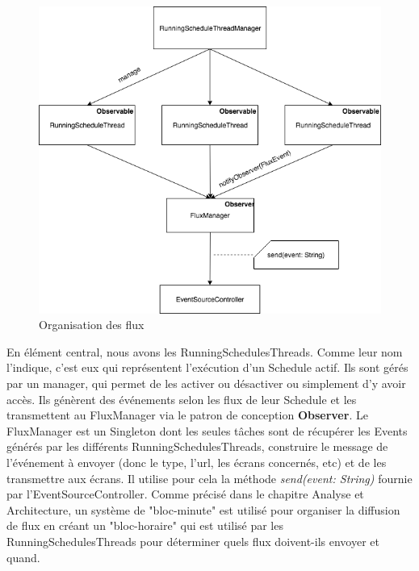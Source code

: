 \documentclass[french]{article}
\begin{document}
\begin{figure}[h]
	\centering	
	\includegraphics[width=0.8\linewidth]{schemas/flux_organisation.png}%
	\caption{Organisation des flux}
\end{figure}

En élément central, nous avons les RunningSchedulesThreads. Comme leur nom l'indique, c'est eux qui représentent l'exécution d'un Schedule actif. Ils sont gérés par un manager, qui permet de les activer ou désactiver ou simplement d'y avoir accès. Ils génèrent des événements selon les flux de leur Schedule et les transmettent au FluxManager via le patron de conception \textbf{Observer}. \newline
Le FluxManager est un Singleton dont les seules tâches sont de récupérer les Events générés par les différents RunningSchedulesThreads, construire le message de l'événement à envoyer (donc le type, l'url, les écrans concernés, etc) et de les transmettre aux écrans. Il utilise pour cela la méthode \textit{send(event: String)} fournie par l'EventSourceController.\newline
Comme précisé dans le chapitre Analyse et Architecture, un système de "bloc-minute" est utilisé pour organiser la diffusion de flux en créant un "bloc-horaire" qui est utilisé par les RunningSchedulesThreads pour déterminer quels flux doivent-ils envoyer et quand.
\end{document}
